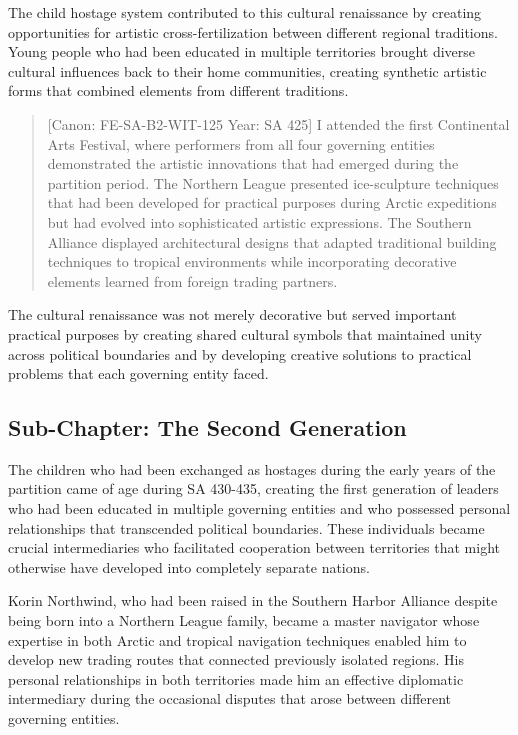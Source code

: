 The child hostage system contributed to this cultural renaissance by
creating opportunities for artistic cross-fertilization between
different regional traditions. Young people who had been educated in
multiple territories brought diverse cultural influences back to their
home communities, creating synthetic artistic forms that combined
elements from different traditions.

\begin{quote}
{[}Canon: FE-SA-B2-WIT-125 \textbar{} Year: SA 425{]} I attended the
first Continental Arts Festival, where performers from all four
governing entities demonstrated the artistic innovations that had
emerged during the partition period. The Northern League presented
ice-sculpture techniques that had been developed for practical purposes
during Arctic expeditions but had evolved into sophisticated artistic
expressions. The Southern Alliance displayed architectural designs that
adapted traditional building techniques to tropical environments while
incorporating decorative elements learned from foreign trading partners.
\end{quote}

The cultural renaissance was not merely decorative but served important
practical purposes by creating shared cultural symbols that maintained
unity across political boundaries and by developing creative solutions
to practical problems that each governing entity faced.

\subsection{Sub-Chapter: The Second
Generation}\label{sub-chapter-the-second-generation}

The children who had been exchanged as hostages during the early years
of the partition came of age during SA 430-435, creating the first
generation of leaders who had been educated in multiple governing
entities and who possessed personal relationships that transcended
political boundaries. These individuals became crucial intermediaries
who facilitated cooperation between territories that might otherwise
have developed into completely separate nations.

Korin Northwind, who had been raised in the Southern Harbor Alliance
despite being born into a Northern League family, became a master
navigator whose expertise in both Arctic and tropical navigation
techniques enabled him to develop new trading routes that connected
previously isolated regions. His personal relationships in both
territories made him an effective diplomatic intermediary during the
occasional disputes that arose between different governing entities.

